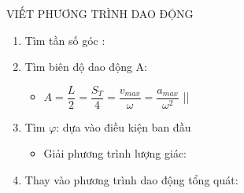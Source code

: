 \begin{dang}{VIẾT PHƯƠNG TRÌNH DAO ĐỘNG}
\begin{enumerate}
\item Tìm tần số góc \bth{\omega}: 
\item Tìm biên độ dao động A: 
\begin{itemize}
\item $A=\dfrac{L}{2}=\dfrac{S_T}{4}=\dfrac{v_{max}}{\omega}=\dfrac{a_{max}}{\omega^2}$
\quad || 
\end{itemize}
\item Tìm $\varphi$: dựa vào điều kiện ban đầu 
\begin{itemize}
\item Giải phương trình lượng giác: 
\end{itemize}
\item Thay vào phương trình dao động tổng quát: 
\end{enumerate}
\end{dang}
